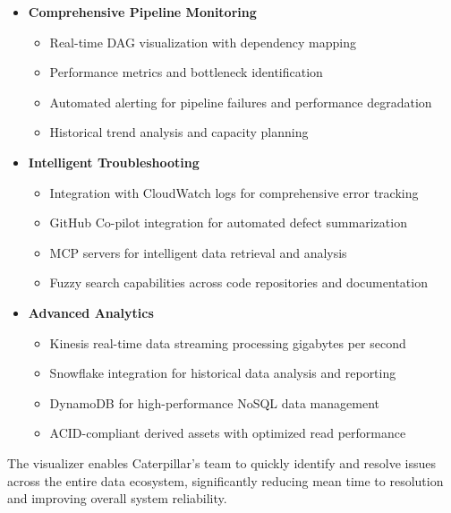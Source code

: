 \documentclass[12pt, a4paper]{article} %
\begin{document}
\begin{itemize}
    \item \textbf{Comprehensive Pipeline Monitoring}
    \begin{itemize}
        \item Real-time DAG visualization with dependency mapping
        \item Performance metrics and bottleneck identification
        \item Automated alerting for pipeline failures and performance degradation
        \item Historical trend analysis and capacity planning
    \end{itemize}
    
    \item \textbf{Intelligent Troubleshooting}
    \begin{itemize}
        \item Integration with CloudWatch logs for comprehensive error tracking
        \item GitHub Co-pilot integration for automated defect summarization
        \item MCP servers for intelligent data retrieval and analysis
        \item Fuzzy search capabilities across code repositories and documentation
    \end{itemize}
    
    \item \textbf{Advanced Analytics}
    \begin{itemize}
        \item Kinesis real-time data streaming processing gigabytes per second
        \item Snowflake integration for historical data analysis and reporting
        \item DynamoDB for high-performance NoSQL data management
        \item ACID-compliant derived assets with optimized read performance
    \end{itemize}
\end{itemize}

The visualizer enables Caterpillar's team to quickly identify and resolve issues across the entire data ecosystem, significantly reducing mean time to resolution and improving overall system reliability.

\end{document}
